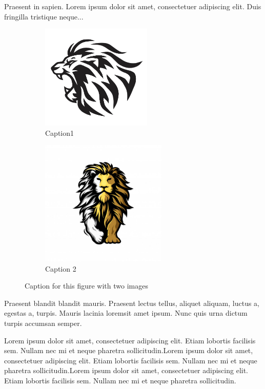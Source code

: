 \documentclass[12pt]{article}
\begin{document}
Praesent in sapien. Lorem ipsum dolor sit amet, consectetuer 
adipiscing elit. Duis fringilla tristique neque... 

\begin{figure}[h]

\begin{subfigure}{0.5\textwidth}
\includegraphics[width=0.9\linewidth, height=5cm]{./lion.jpg} 
\caption{Caption1}
\label{fig:subim1}
\end{subfigure}
\begin{subfigure}{0.5\textwidth}
\includegraphics[width=0.9\linewidth, height=6cm]{./lion2.jpg}
\caption{Caption 2}
\label{fig:subim2}
\end{subfigure}

\caption{Caption for this figure with two images}
\label{fig:image2}
\end{figure}

Praesent blandit blandit mauris. Praesent
lectus tellus, aliquet aliquam, luctus a, egestas a, turpis. Mauris 
lacinia loremsit amet ipsum. Nunc quis urna dictum turpis accumsan 
semper.




\newpage




Lorem ipsum dolor sit amet, consectetuer adipiscing elit. 
Etiam lobortis facilisis sem. Nullam nec mi et neque pharetra sollicitudin.Lorem ipsum dolor sit amet, consectetuer adipiscing elit. Etiam lobortis facilisis sem. Nullam nec mi et neque pharetra sollicitudin.Lorem ipsum dolor sit amet, consectetuer adipiscing elit. Etiam lobortis facilisis sem. Nullam nec mi et neque pharetra sollicitudin.
\end{document}
